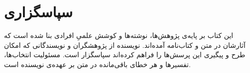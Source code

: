 \chapter*{سپاسگزاری}

این کتاب بر پایه‌ی پژوهش‌ها، نوشته‌ها و کوشش علمیِ افرادی بنا شده است
که آثارشان در متن و کتاب‌نامه آمده‌اند. نویسنده از پژوهشگران و
نویسندگانی که امکان طرح و پیگیری این پرسش‌ها را فراهم کرده‌اند
سپاسگزار است. مسئولیت انتخاب‌ها، تفسیرها و هر خطای باقی‌مانده در متن
بر عهده‌ی نویسنده است.
